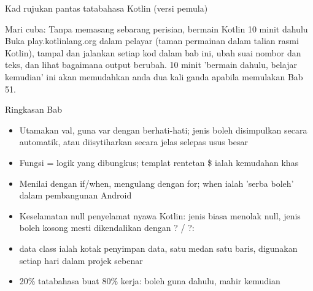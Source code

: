 \begin{center}\small\color{gray}Kad rujukan pantas tatabahasa Kotlin (versi pemula)\end{center}

\begin{tcbpractice}{Mari cuba: Tanpa memasang sebarang perisian, bermain Kotlin 10 minit dahulu}
Buka play.kotlinlang.org dalam pelayar (taman permainan dalam talian rasmi Kotlin), tampal dan jalankan setiap kod dalam bab ini, ubah suai nombor dan teks, dan lihat bagaimana output berubah. 10 minit 'bermain dahulu, belajar kemudian' ini akan memudahkan anda dua kali ganda apabila memulakan Bab 51.

\end{tcbpractice}

\begin{tcbsummary}{Ringkasan Bab}
\begin{itemize}
  \item Utamakan val, guna var dengan berhati-hati; jenis boleh disimpulkan secara automatik, atau diisytiharkan secara jelas selepas usus besar
  \item Fungsi = logik yang dibungkus; templat rentetan \$ ialah kemudahan khas
  \item Menilai dengan if/when, mengulang dengan for; when ialah 'serba boleh' dalam pembangunan Android
  \item Keselamatan null penyelamat nyawa Kotlin: jenis biasa menolak null, jenis boleh kosong mesti dikendalikan dengan ? / ?:
  \item data class ialah kotak penyimpan data, satu medan satu baris, digunakan setiap hari dalam projek sebenar
  \item 20\% tatabahasa buat 80\% kerja: boleh guna dahulu, mahir kemudian
\end{itemize}

\end{tcbsummary}
